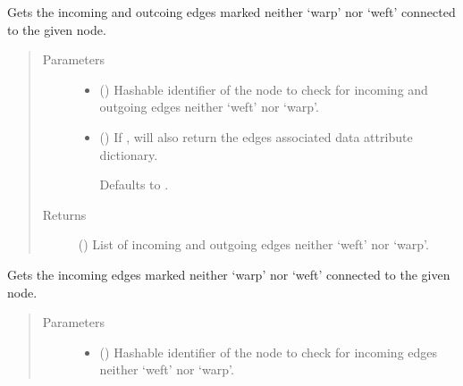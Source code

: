 \documentclass[letterpaper,10pt,english]{sphinxmanual}
\begin{document}
\begin{fulllineitems}
\begin{fulllineitems}
\label{\detokenize{cockatoo:cockatoo.KnitDiNetwork.node_contour_edges}}
Gets the incoming and outcoing edges marked neither ‘warp’ nor ‘weft’
connected to the given node.
\begin{quote}\begin{description}
\item[{Parameters}] \leavevmode\begin{itemize}
\item {} 
 () \textendash{} Hashable identifier of the node to check for incoming and outgoing
edges neither ‘weft’ nor ‘warp’.

\item {} 
 (\sphinxstyleliteralemphasis{\sphinxupquote{, }}) \textendash{} 
If , will also return the edges associated data attribute
dictionary.

Defaults to .


\end{itemize}

\item[{Returns}] \leavevmode
{} () \textendash{} List of incoming and outgoing edges neither ‘weft’ nor ‘warp’.

\end{description}\end{quote}

\end{fulllineitems}


\begin{fulllineitems}
\label{\detokenize{cockatoo:cockatoo.KnitDiNetwork.node_contour_edges_in}}
Gets the incoming edges marked neither ‘warp’ nor ‘weft’ connected to
the given node.
\begin{quote}\begin{description}
\item[{Parameters}] \leavevmode\begin{itemize}
\item {} 
 () \textendash{} Hashable identifier of the node to check for incoming edges neither
‘weft’ nor ‘warp’.


\end{itemize}
\end{description}
\end{quote}
\end{fulllineitems}
\end{fulllineitems}
\end{document}
